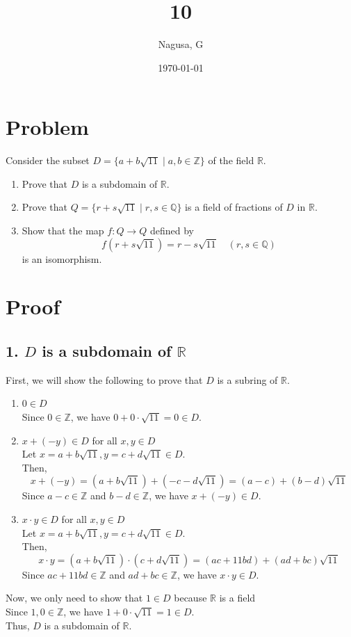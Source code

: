 \documentclass[11pt, a4paper]{article}
\title{10}
\author{Nagusa, G}
\date{\today}
\begin{document}
\maketitle

\section*{Problem}
Consider the subset $D = \{ a + b\sqrt{11} \mid a,b \in \mathbb{Z} \}$ of the field $\mathbb{R}$.
\begin{enumerate}
    \item Prove that $D$ is a subdomain of $\mathbb{R}$.
    \item Prove that $Q = \{ r + s\sqrt{11} \mid r, s \in \mathbb{Q} \}$ is a field of fractions of $D$ in $\mathbb{R}$.
    \item Show that the map $f : Q \to Q$ defined by
    \[
    f(r + s\sqrt{11}) = r - s\sqrt{11} \quad (r, s \in \mathbb{Q})
    \]
    is an isomorphism.
\end{enumerate}

\section*{Proof}

\subsection*{1. $D$ is a subdomain of $\mathbb{R}$}
First, we will show the following to prove that $D$ is a subring of $\mathbb{R}$.
\begin{enumerate}
    \item $0 \in D$\\
    Since $0\in \mathbb{Z}$, we have $0+0\cdot \sqrt{11} = 0 \in D$.

    \item $x + (-y) \in D$ for all $x, y \in D$\\
    Let $x = a + b\sqrt{11}, y = c + d\sqrt{11} \in D$.\\
    Then,
    \[
        x + (-y) = (a + b\sqrt{11}) + (-c -d\sqrt{11}) = (a-c) + (b-d)\sqrt{11}
    \]
    Since $a-c \in \mathbb{Z}$ and $b-d \in \mathbb{Z}$, we have $x + (-y) \in D$.

    \item $x \cdot y \in D$ for all $x, y \in D$\\
    Let $x = a + b\sqrt{11}, y = c + d\sqrt{11} \in D$.\\
    Then,
    \[
        x \cdot y = (a + b\sqrt{11}) \cdot (c + d\sqrt{11}) = (ac+11bd) + (ad+bc)\sqrt{11}
    \]
    Since $ac+11bd \in \mathbb{Z}$ and $ad+bc \in \mathbb{Z}$, we have $x \cdot y \in D$.
\end{enumerate}
Now, we only need to show that $1 \in D$ because $\mathbb{R}$ is a field\\
Since $1,0\in \mathbb{Z}$, we have $1+0\cdot \sqrt{11} = 1 \in D$.\\
Thus, $D$ is a subdomain of $\mathbb{R}$.
\end{document}
